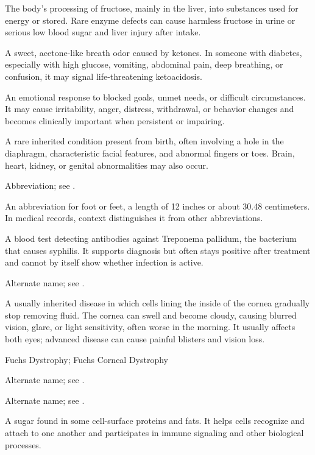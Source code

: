  The body’s processing of fructose, mainly in the liver, into substances used for energy or stored. Rare enzyme defects can cause harmless fructose in urine or serious low blood sugar and liver injury after intake.

 A sweet, acetone-like breath odor caused by ketones. In someone with diabetes, especially with high glucose, vomiting, abdominal pain, deep breathing, or confusion, it may signal life-threatening ketoacidosis.

 An emotional response to blocked goals, unmet needs, or difficult circumstances. It may cause irritability, anger, distress, withdrawal, or behavior changes and becomes clinically important when persistent or impairing.

 A rare inherited condition present from birth, often involving a hole in the diaphragm, characteristic facial features, and abnormal fingers or toes. Brain, heart, kidney, or genital abnormalities may also occur.

 Abbreviation; see .

 An abbreviation for foot or feet, a length of 12 inches or about 30.48 centimeters. In medical records, context distinguishes it from other abbreviations.

 A blood test detecting antibodies against Treponema pallidum, the bacterium that causes syphilis. It supports diagnosis but often stays positive after treatment and cannot by itself show whether infection is active.

 Alternate name; see .

 A usually inherited disease in which cells lining the inside of the cornea gradually stop removing fluid. The cornea can swell and become cloudy, causing blurred vision, glare, or light sensitivity, often worse in the morning. It usually affects both eyes; advanced disease can cause painful blisters and vision loss.

\synonyms
Fuchs Dystrophy; Fuchs Corneal Dystrophy

 Alternate name; see .

 Alternate name; see .

 A sugar found in some cell-surface proteins and fats. It helps cells recognize and attach to one another and participates in immune signaling and other biological processes.

